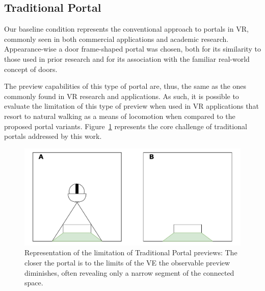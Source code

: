 \subsection{Traditional Portal}
\label{sec:trad-portal-design}

Our baseline condition represents the conventional approach to portals in \gls{VR}, commonly seen in both commercial applications
and academic research. Appearance-wise a door frame-shaped portal was chosen, both for its similarity to those used in prior 
research and for its association with the familiar real-world concept of doors.

The preview capabilities of this type of portal are, thus, the same as the ones commonly found in \gls{VR} research and applications. As such, 
it is possible to evaluate the limitation of this type of preview when used in \gls{VR} applications that resort to natural walking as a means 
of locomotion when compared to the proposed portal variants. Figure~\ref{fig:trad-portal-preview} represents the core challenge of traditional portals 
addressed by this work.

\begin{figure}[t]
    \centering
     \includegraphics[width=.75\textwidth]{NOVAthesisFiles/Images/schemes/trad-portal-preview.drawio.pdf}
     \caption[Representation of the limitation of Traditional Portal previews.]
     {Representation of the limitation of Traditional Portal previews: The closer the portal is to the limits of the \gls{VE} the 
     observable preview diminishes, often revealing only a narrow segment of the connected space.}
     \label{fig:trad-portal-preview}
\end{figure}

